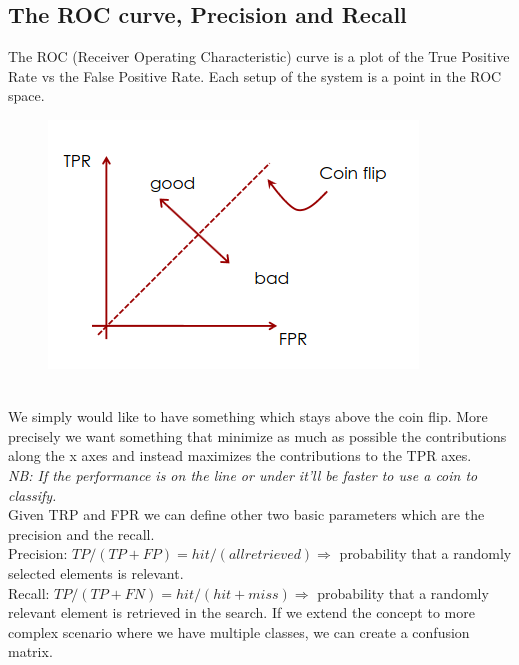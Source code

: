 \subsection{The ROC curve, Precision and Recall}
The ROC (Receiver Operating Characteristic) curve is a plot of the True Positive Rate vs the False Positive Rate. Each setup of the system is a point in the ROC space.
\begin{figure}[h]
    \centering
    \includegraphics[scale=0.5]{Figures/ROC.png}
\end{figure}
\\We simply would like to have something which stays above the coin flip. More precisely we want something that minimize as much as possible the contributions along the x axes and instead maximizes the contributions to the TPR axes.
\\\textit{NB: If the performance is on the line or under it'll be faster to use a coin to classify.}\\
Given TRP and FPR we can define other two basic parameters which are the precision and the recall.
\\Precision: $TP/(TP+FP) = hit/(all retrieved) \Rightarrow$ probability that a randomly selected elements is relevant.
\\Recall: $TP/(TP+FN) = hit/(hit+miss) \Rightarrow$ probability that a randomly relevant element is retrieved in the search.
If we extend the concept to more complex scenario where we have multiple classes, we can create a confusion matrix. 
